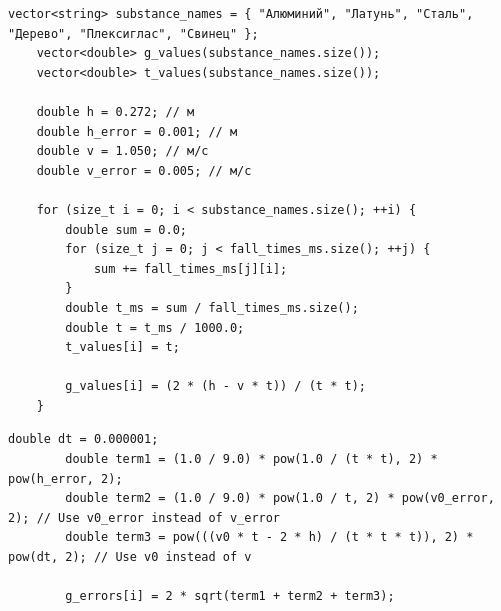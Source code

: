 \begin{lstlisting}[label=listing1, caption=Функция для вычисления ускорения свободного падения]
vector<string> substance_names = { "Алюминий", "Латунь", "Сталь", "Дерево", "Плексиглас", "Свинец" };
    vector<double> g_values(substance_names.size());
    vector<double> t_values(substance_names.size());

    double h = 0.272; // м
    double h_error = 0.001; // м
    double v = 1.050; // м/с
    double v_error = 0.005; // м/с

    for (size_t i = 0; i < substance_names.size(); ++i) {
        double sum = 0.0;
        for (size_t j = 0; j < fall_times_ms.size(); ++j) {
            sum += fall_times_ms[j][i];
        }
        double t_ms = sum / fall_times_ms.size();
        double t = t_ms / 1000.0;               
        t_values[i] = t;

        g_values[i] = (2 * (h - v * t)) / (t * t);
    }
\end{lstlisting}

\begin{lstlisting}[label=listing1, caption=Функция для вычисления погрешности ускорения свободного падения]
        double dt = 0.000001;
        double term1 = (1.0 / 9.0) * pow(1.0 / (t * t), 2) * pow(h_error, 2);
        double term2 = (1.0 / 9.0) * pow(1.0 / t, 2) * pow(v0_error, 2); // Use v0_error instead of v_error
        double term3 = pow(((v0 * t - 2 * h) / (t * t * t)), 2) * pow(dt, 2); // Use v0 instead of v

        g_errors[i] = 2 * sqrt(term1 + term2 + term3);
\end{lstlisting}

\clearpage
